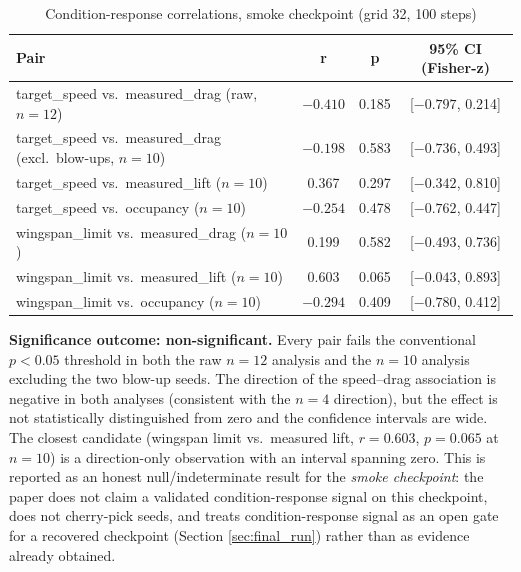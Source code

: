 \begin{table}[!t]
\centering
\caption{Condition-response correlations, smoke checkpoint (grid 32, 100 steps)}
\label{tab:condition_stats}
\footnotesize
\setlength{\tabcolsep}{2pt}
\begin{tabular}{|l|c|c|c|}
\hline
\textbf{Pair} & \textbf{r} & \textbf{p} & \textbf{95\% CI (Fisher-z)} \\ \hline
target\_speed vs.\ measured\_drag (raw, \(n=12\)) & $-0.410$ & 0.185 & [$-0.797$, 0.214] \\
target\_speed vs.\ measured\_drag (excl.\ blow-ups, \(n=10\)) & $-0.198$ & 0.583 & [$-0.736$, 0.493] \\
target\_speed vs.\ measured\_lift (\(n=10\)) & 0.367 & 0.297 & [$-0.342$, 0.810] \\
target\_speed vs.\ occupancy (\(n=10\)) & $-0.254$ & 0.478 & [$-0.762$, 0.447] \\
wingspan\_limit vs.\ measured\_drag (\(n=10\)) & 0.199 & 0.582 & [$-0.493$, 0.736] \\
wingspan\_limit vs.\ measured\_lift (\(n=10\)) & 0.603 & 0.065 & [$-0.043$, 0.893] \\
wingspan\_limit vs.\ occupancy (\(n=10\)) & $-0.294$ & 0.409 & [$-0.780$, 0.412] \\ \hline
\end{tabular}
\end{table}

\textbf{Significance outcome: non-significant.} Every pair fails the conventional \(p < 0.05\) threshold in both the raw \(n=12\) analysis and the \(n=10\) analysis excluding the two blow-up seeds. The direction of the speed--drag association is negative in both analyses (consistent with the \(n=4\) direction), but the effect is not statistically distinguished from zero and the confidence intervals are wide. The closest candidate (wingspan limit vs.\ measured lift, \(r=0.603\), \(p=0.065\) at \(n=10\)) is a direction-only observation with an interval spanning zero. This is reported as an honest null/indeterminate result for the \emph{smoke checkpoint}: the paper does not claim a validated condition-response signal on this checkpoint, does not cherry-pick seeds, and treats condition-response signal as an open gate for a recovered checkpoint (Section \ref{sec:final_run}) rather than as evidence already obtained.

